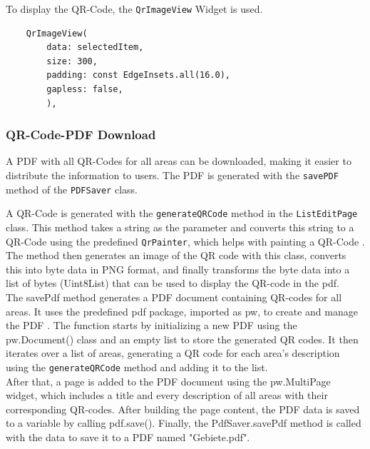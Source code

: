 To display the QR-Code, the \texttt{QrImageView} Widget is used. 

\lstset{style=mycsharp, caption=QrCode Generation in ListEditPage}
\begin{lstlisting}
    QrImageView(
        data: selectedItem,
        size: 300,
        padding: const EdgeInsets.all(16.0),
        gapless: false,
        ),
\end{lstlisting}

\subsubsection{QR-Code-PDF Download}
A PDF with all QR-Codes for all areas can be downloaded, making it easier to distribute the information to users. The PDF is generated with the \texttt{savePDF} method of the \texttt{PDFSaver} class.

A QR-Code is generated with the \texttt{generateQRCode} method in the \texttt{ListEditPage} class. This method takes a string as the parameter and converts this string to a QR-Code using the predefined \texttt{QrPainter}, which helps with painting a QR-Code \autocite{pub.dev/QrPainter-class}. The method then generates an image of the QR code with this class, converts this into byte data in PNG format, and finally transforms the byte data into a list of bytes (Uint8List) that can be used to display the QR-code in the pdf.\\

The savePdf method generates a PDF document containing QR-codes for all areas. It uses the predefined pdf package, imported as pw, to create and manage the PDF \autocite{pub.dev/pdf}. The function starts by initializing a new PDF using the pw.Document() class and an empty list to store the generated QR codes. It then iterates over a list of areas, generating a QR code for each area's description using the \texttt{generateQRCode} method and adding it to the list.\\

After that, a page is added to the PDF document using the pw.MultiPage widget, which includes a title and every description of all areas with their corresponding QR-codes. After building the page content, the PDF data is saved to a variable by calling pdf.save(). Finally, the PdfSaver.savePdf method is called with the data to save it to a PDF named "Gebiete.pdf".







